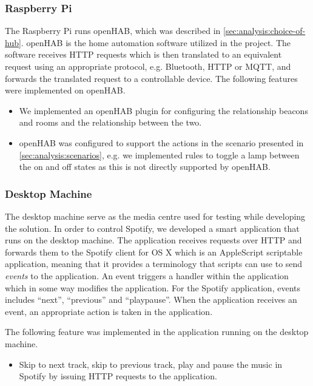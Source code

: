 \subsubsection{Raspberry Pi}

The Raspberry Pi runs openHAB, which was described in \cref{sec:analysis:choice-of-hub}. openHAB is the home automation software utilized in the project. The software receives HTTP requests which is then translated to an equivalent request using an appropriate protocol, e.g. Bluetooth, HTTP or MQTT, and forwards the translated request to a controllable device. The following features were implemented on openHAB.

\begin{itemize}
\item We implemented an openHAB plugin for configuring the relationship beacons and rooms and the relationship between the two.
\item openHAB was configured to support the actions in the scenario presented in \cref{sec:analysis:scenarios}, e.g. we implemented rules to toggle a lamp between the on and off states as this is not directly supported by openHAB.
\end{itemize}

\subsubsection{Desktop Machine}

The desktop machine serve as the media centre used for testing while developing the solution. In order to control Spotify, we developed a smart application that runs on the desktop machine. The application receives requests over HTTP and forwards them to the Spotify client for OS X which is an AppleScript scriptable application, meaning that it provides a terminology that scripts can use to send \emph{events} to the application. An event triggers a handler within the application which in some way modifies the application. For the Spotify application, events includes ``next'', ``previous'' and ``playpause''. When the application receives an event, an appropriate action is taken in the application.

The following feature was implemented in the application running on the desktop machine.

\begin{itemize}
\item Skip to next track, skip to previous track, play and pause the music in Spotify by issuing HTTP requests to the application.
\end{itemize}

